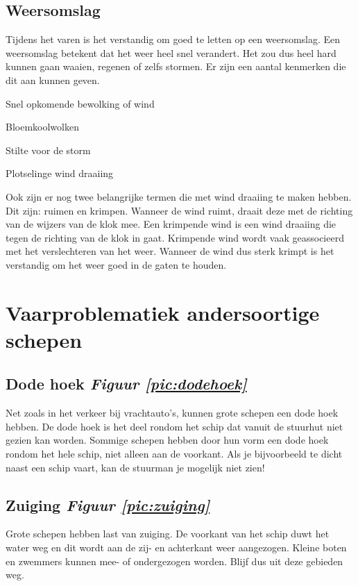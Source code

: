 \subsection{Weersomslag}
Tijdens het varen is het verstandig om goed te letten op een weersomslag. Een weersomslag betekent dat het weer heel snel verandert. Het zou dus heel hard kunnen gaan waaien, regenen of zelfs stormen. Er zijn een aantal kenmerken die dit aan kunnen geven. 
\begin{itemize}
    \begin{multicols}{2}
    \item Snel opkomende bewolking of wind
    \item Bloemkoolwolken
    \item Stilte voor de storm
    \item Plotselinge wind draaiing
    \end{multicols}
\end{itemize}
Ook zijn er nog twee belangrijke termen die met wind draaiing te maken hebben. Dit zijn: ruimen en krimpen. Wanneer de wind ruimt, draait deze met de richting van de wijzers van de klok mee. Een krimpende wind is een wind draaiing die tegen de richting van de klok in gaat. Krimpende wind wordt vaak geassocieerd met het verslechteren van het weer. Wanneer de wind dus sterk krimpt is het verstandig om het weer goed in de gaten te houden.

\newpage
\section{Vaarproblematiek andersoortige schepen}
\subsection{Dode hoek \hfill \textit{Figuur \ref{pic:dodehoek}}}
Net zoals in het verkeer bij vrachtauto's, kunnen grote schepen een dode hoek hebben. De dode hoek is het deel rondom het schip dat vanuit de stuurhut niet gezien kan worden. Sommige schepen hebben door hun vorm een dode hoek rondom het hele schip, niet alleen aan de voorkant. Als je bijvoorbeeld te dicht naast een schip vaart, kan de stuurman je mogelijk niet zien!

\subsection{Zuiging \hfill \textit{Figuur \ref{pic:zuiging}}}
Grote schepen hebben last van zuiging. De voorkant van het schip duwt het water weg en dit wordt aan de zij- en achterkant weer aangezogen. Kleine boten en zwemmers kunnen mee- of ondergezogen worden. Blijf dus uit deze gebieden weg.

